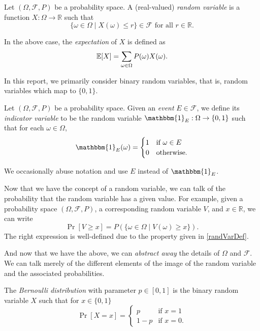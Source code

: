 \begin{definition}
\label{randVarDef}
    Let $(\Omega,\mathcal{F},P)$ be a probability space. A (real-valued) \textit{random variable} is a function $X:\Omega\to \mathbb{R}$ such that
    $$\{\omega\in\Omega\mid X(\omega)\leq r\}\in\mathcal{F}\text{ for all }r\in\mathbb{R}.$$
\end{definition}

In the above case, the \textit{expectation} of $X$ is defined as
$$\mathbb{E}[X]=\sum_{\omega\in\Omega}P(\omega)X(\omega).$$

\vspace{2mm}
In this report, we primarily consider binary random variables, that is, random variables which map to $\{0,1\}$.

\begin{definition}
    Let $(\Omega,\mathcal{F},P)$ be a probability space. Given an \textit{event} $E\in\mathcal{F}$, we define its \textit{indicator variable} to be the random variable $\mathbbm{1}_E:\Omega\to\{0,1\}$ such that for each $\omega\in\Omega$,
    $$
    \mathbbm{1}_E(\omega)=
    \begin{cases}
    1 & \text{if $\omega\in E$} \\
    0 & \text{otherwise.}
    \end{cases}
    $$
\end{definition}

We occasionally abuse notation and use $E$ instead of $\mathbbm{1}_E$.

\vspace{2mm}
Now that we have the concept of a random variable, we can talk of the probability that the random variable has a given value. For example, given a probability space $(\Omega,\mathcal{F},P)$, a corresponding random variable $V$, and $x\in\mathbb{R}$, we can write
$$\Pr[V\geq x]=P\left(\{\omega\in\Omega\mid V(\omega)\geq x\}\right).$$
The right expression is well-defined due to the property given in \ref{randVarDef}.

\vspace{2mm}
And now that we have the above, we can \textit{abstract away} the details of $\Omega$ and $\mathcal{F}$. We can talk merely of the different elements of the image of the random variable and the associated probabilities.

\begin{definition}
    The \textit{Bernoulli distribution} with parameter $p\in[0,1]$ is the binary random variable $X$ such that for $x\in\{0,1\}$
    $$
    \Pr[X=x]=
    \begin{cases}
    p & \text{if }x=1 \\
    1-p & \text{if }x=0.
    \end{cases}
    $$
\end{definition}

